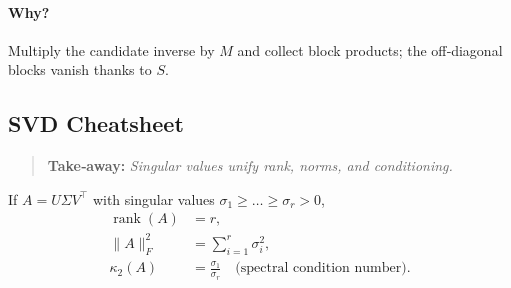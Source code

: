 \paragraph{Why?}
Multiply the candidate inverse by $M$ and collect block products; the off‑diagonal
blocks vanish thanks to $S$.

\subsection{SVD Cheatsheet}
\begin{quote}
\textbf{Take‑away:} \emph{Singular values unify rank, norms, and conditioning.}
\end{quote}

If $A=U\Sigma V^\top$ with singular values $\sigma_1\ge\dots\ge\sigma_r>0$,
\begin{align}
\operatorname{rank}(A) &= r,\\
\|A\|_F^2             &= \sum_{i=1}^{r}\sigma_i^2,\\
\kappa_2(A)           &= \frac{\sigma_1}{\sigma_r}\quad\text{(spectral condition number)}.
\end{align}